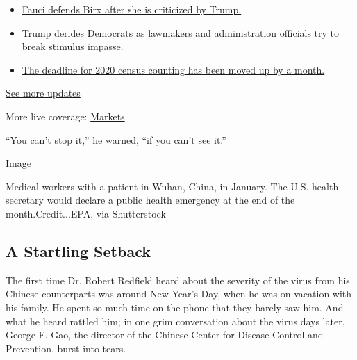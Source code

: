 \begin{itemize}
\tightlist
\item
  \href{https://www.nytimes3xbfgragh.onion/2020/08/03/world/coronavirus-covid-19.html?action=click\&pgtype=Article\&state=default\&region=MAIN_CONTENT_1\&context=storylines_live_updates\#link-4547638f}{Fauci
  defends Birx after she is criticized by Trump.}
\item
  \href{https://www.nytimes3xbfgragh.onion/2020/08/03/world/coronavirus-covid-19.html?action=click\&pgtype=Article\&state=default\&region=MAIN_CONTENT_1\&context=storylines_live_updates\#link-15e7f995}{Trump
  derides Democrats as lawmakers and administration officials try to
  break stimulus impasse.}
\item
  \href{https://www.nytimes3xbfgragh.onion/2020/08/03/world/coronavirus-covid-19.html?action=click\&pgtype=Article\&state=default\&region=MAIN_CONTENT_1\&context=storylines_live_updates\#link-e5a2cda}{The
  deadline for 2020 census counting has been moved up by a month.}
\end{itemize}

\href{https://www.nytimes3xbfgragh.onion/2020/08/03/world/coronavirus-covid-19.html?action=click\&pgtype=Article\&state=default\&region=MAIN_CONTENT_1\&context=storylines_live_updates}{See
more updates}

More live coverage:
\href{https://www.nytimes3xbfgragh.onion/live/2020/08/03/business/stock-market-today-coronavirus?action=click\&pgtype=Article\&state=default\&region=MAIN_CONTENT_1\&context=storylines_live_updates}{Markets}

``You can't stop it,'' he warned, ``if you can't see it.''

Image

Medical workers with a patient in Wuhan, China, in January. The U.S.
health secretary would declare a public health emergency at the end of
the month.Credit...EPA, via Shutterstock

\hypertarget{a-startling-setback}{%
\subsection{A Startling Setback}\label{a-startling-setback}}

The first time Dr. Robert Redfield heard about the severity of the virus
from his Chinese counterparts was around New Year's Day, when he was on
vacation with his family. He spent so much time on the phone that they
barely saw him. And what he heard rattled him; in one grim conversation
about the virus days later, George F. Gao, the director of the Chinese
Center for Disease Control and Prevention, burst into tears.

